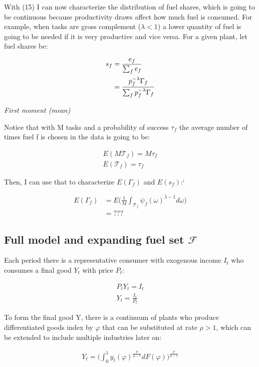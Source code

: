 \documentclass{article}
\begin{document}
With (15) I can now characterize the distribution of fuel shares, which is going to be continuous because productivity draws affect how much fuel is consumed. For example, when tasks are gross complement ($\lambda < 1$) a lower quantity of fuel is going to be needed if it is very productive and vice versa. For a given plant, let fuel shares be:

\begin{align}
    s_{f} &= \frac{e_{f}}{\sum_f e_{f}} \notag\\
    &= \frac{p_f^{-\lambda} \Gamma_{f}}{\sum_f p_f^{-\lambda} \Gamma_{f}}
\end{align}

\textit{First moment (mean)}

Notice that with M tasks and a probability of success $\tau_f$ the average number of times fuel f is chosen in the data is going to be:

\begin{align*}
    E(M \mathcal{T}_f) = M \tau_f \\
    E(\mathcal{T}_f)  = \tau_f
\end{align*}

Then, I can use that to characterize $E(\Gamma_f)$ and $E(s_f)$:`

\begin{align*}
    E(\Gamma_f) &= E\Big( \frac{1}{M} \int_{\mathcal{T}_f} \psi_f(\omega)^{\lambda-1} d\omega \Big) \\
    &= ???
\end{align*}

\subsection{Full model and expanding fuel set $\mathcal{F}$}

Each period there is a representative consumer with exogenous income $I_t$ who consumes a final good $Y_t$ with price $P_t$:

\begin{align*}
    P_t Y_t = I_t \\
    Y_t = \frac{I_t}{P_t}
\end{align*}

To form the final good Y, there is a continuum of plants who produce differentiated goods index by $\varphi$ that can be substituted at rate $\rho > 1$, which can be extended to include multiple industries later on:

\begin{align}
    Y_t = \Big( \int_0^1 y_t(\varphi)^{\frac{\rho}{\rho-1}} dF(\varphi)  \Big)^{\frac{\rho}{\rho-1}}
\end{align}
\end{document}
